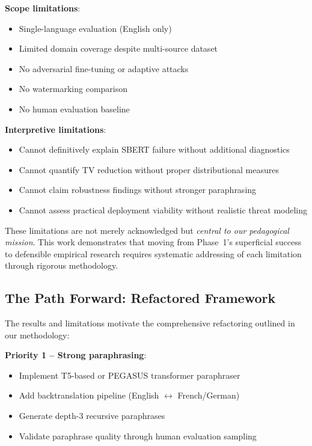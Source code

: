 \documentclass[conference]{IEEEtran}
\begin{document}
\textbf{Scope limitations}:
\begin{itemize}
    \item Single-language evaluation (English only)
    \item Limited domain coverage despite multi-source dataset
    \item No adversarial fine-tuning or adaptive attacks
    \item No watermarking comparison
    \item No human evaluation baseline
\end{itemize}

\textbf{Interpretive limitations}:
\begin{itemize}
    \item Cannot definitively explain SBERT failure without additional diagnostics
    \item Cannot quantify TV reduction without proper distributional measures
    \item Cannot claim robustness findings without stronger paraphrasing
    \item Cannot assess practical deployment viability without realistic threat modeling
\end{itemize}

These limitations are not merely acknowledged but \emph{central to our pedagogical mission}. This work demonstrates that moving from Phase~1's superficial success to defensible empirical research requires systematic addressing of each limitation through rigorous methodology.

\subsection{The Path Forward: Refactored Framework}

The results and limitations motivate the comprehensive refactoring outlined in our methodology:

\textbf{Priority 1 – Strong paraphrasing}:
\begin{itemize}
    \item Implement T5-based or PEGASUS transformer paraphraser
    \item Add backtranslation pipeline (English $\leftrightarrow$ French/German)
    \item Generate depth-3 recursive paraphrases
    \item Validate paraphrase quality through human evaluation sampling
\end{itemize}
\end{document}
